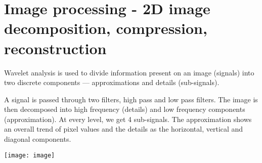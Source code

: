 \documentclass{article}
\begin{document}
\pagebreak

\section*{Image processing - 2D image decomposition, compression, reconstruction}
Wavelet analysis is used to divide information present on an image (signals) into two discrete components — approximations and details (sub-signals).

A signal is passed through two filters, high pass and low pass filters. The image is then decomposed into high frequency (details) and low frequency components (approximation). At every level, we get 4 sub-signals. The approximation shows an overall trend of pixel values and the details as the horizontal, vertical and diagonal components.


 \texttt{[image: image]}
\end{document}
